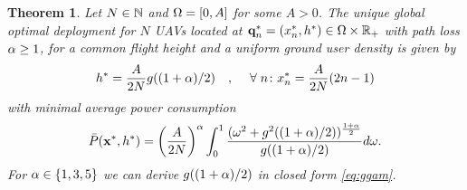 \documentclass[smallabstract,smallcaptions]{dccpaper}
\newtheorem{theorem}{Theorem}
\newcommand{\Pbar}{\ensuremath{\bar{P}}}         %
\newcommand{\philippstart}{\color{black}}
\begin{document}
\newcommand{\pGlob}{\ensuremath{x^{*}}}
\newcommand{\hGlob}{\ensuremath{h^{*}}}
\newcommand{\qGlob}{\ensuremath{{\mathbf q}^{*}}}
\newcommand{\qLoc}{\ensuremath{{\mathbf q}^{*}}}
%
%
\philippstart
%
\begin{theorem}\label{thm:commonheight}
  Let $N\in{\ensuremath{\mathbb N}}$ and $\Omega=[0,A]$ for some $A> 0$. The \emph{unique global optimal deployment} for $N$ UAVs located  at
   $\qLoc_n=(x_n^{*},h^{*})\in \Ome\times
  \R_+$ with path loss $\alpha\geq 1$, for a common flight height and a uniform ground user density is given
  by   
   \begin{align}
     h^*= \frac{A}{2N} g((1+\alp)/2)\quad,\quad\forall n \colon \pGlob_n= \frac{A}{2N} (2n-1)\label{eq:optimaldeploy} 
  \end{align}
  with minimal average power consumption
  \begin{align}
    \Pbar(\vx^*,h^*)=\left(\frac{A}{2N}\right)^{\alp}  \int_0^1
    \frac{(\ome^2+g^2( (1+\alp)/2))^{\frac{1+\alp}{2}}}{g( (1+\alp)/2)}
    d\ome\label{eq:optimumavpow}.
  \end{align}
  For $\alpha\in\{1,3,5\}$ we can derive $g((1+\alpha)/2)$ in closed form  \eqref{eq:ggam}.
\end{theorem}
%
\end{document}
